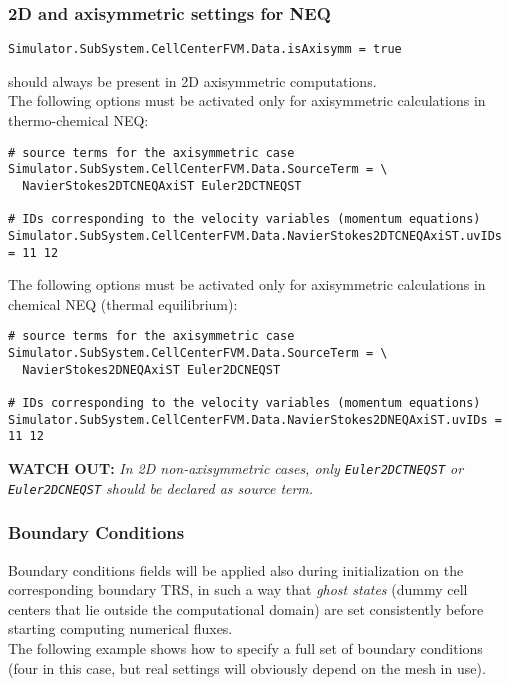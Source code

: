 \documentclass[11pt]{article}
\begin{document}
\subsubsection{2D and axisymmetric settings for NEQ}

\begin{verbatim}
Simulator.SubSystem.CellCenterFVM.Data.isAxisymm = true
\end{verbatim}
should always be present in 2D axisymmetric computations. \\

The following options must be activated only for axisymmetric calculations in thermo-chemical NEQ:

\begin{verbatim}
# source terms for the axisymmetric case
Simulator.SubSystem.CellCenterFVM.Data.SourceTerm = \
  NavierStokes2DTCNEQAxiST Euler2DCTNEQST

# IDs corresponding to the velocity variables (momentum equations) 
Simulator.SubSystem.CellCenterFVM.Data.NavierStokes2DTCNEQAxiST.uvIDs = 11 12
\end{verbatim}

The following options must be activated only for axisymmetric calculations in chemical NEQ (thermal equilibrium):

\begin{verbatim}
# source terms for the axisymmetric case
Simulator.SubSystem.CellCenterFVM.Data.SourceTerm = \
  NavierStokes2DNEQAxiST Euler2DCNEQST

# IDs corresponding to the velocity variables (momentum equations) 
Simulator.SubSystem.CellCenterFVM.Data.NavierStokes2DNEQAxiST.uvIDs = 11 12
\end{verbatim}

{\bf WATCH OUT:} {\it In 2D non-axisymmetric cases, only {\tt Euler2DCTNEQST} or {\tt Euler2DCNEQST} should be declared as source term.}

\subsubsection{Boundary Conditions}

Boundary conditions fields will be applied also during initialization on the corresponding boundary TRS,
in such a way that {\it ghost states} (dummy cell centers that lie outside the computational domain) are set 
consistently before starting computing numerical fluxes. \\
The following example shows how to specify a full set of boundary conditions (four in this case, but 
real settings will obviously depend on the mesh in use).
\end{document}
